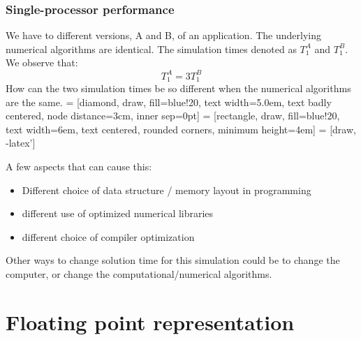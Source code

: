 \documentclass{article}
\begin{document}
\subsubsection{Single-processor performance}
We have to different versions, A and B, of an application. The underlying numerical algorithms are identical. The simulation times denoted as $T_{1}^A$ and $T_{1}^B$. We observe that: 
\begin{equation}
T_{1}^A = 3T_{1}^B
\end{equation}
How can the two simulation times be so different when the numerical algorithms are the same.
 = [diamond, draw, fill=blue!20, 
    text width=5.0em, text badly centered, node distance=3cm, inner sep=0pt]
 = [rectangle, draw, fill=blue!20,
    text width=6em, text centered, rounded corners, minimum height=4em]
 = [draw, -latex']
\newline
{}
\newline
A few aspects that can cause this: \begin{itemize}
\item Different choice of data structure / memory layout in programming
\item different use of optimized numerical libraries
\item different choice of compiler optimization
\end{itemize}
Other ways to change solution time for this simulation could be to change the computer, or change the computational/numerical algorithms.

\section{Floating point representation}
\end{document}
